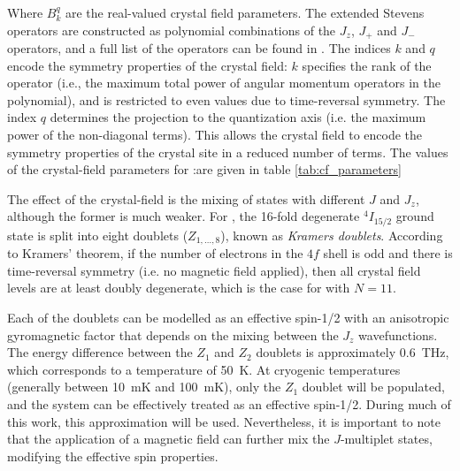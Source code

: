 Where $B_k^q$ are the real-valued crystal field parameters. The extended Stevens operators are constructed as polynomial combinations of the $J_z$, $J_+$ and $J_-$ operators, and a full list of the operators can be found in . The indices $k$ and $q$ encode the symmetry properties of the crystal field: $k$ specifies the rank of the operator (i.e., the maximum total power of angular momentum operators in the polynomial), and is restricted to even values due to time-reversal symmetry. The index $q$ determines the projection to the quantization axis (i.e. the maximum power of the non-diagonal terms). This allows the crystal field to encode the symmetry properties of the crystal site in a reduced number of terms. The values of the crystal-field parameters for \Er:\Ca are given in table \ref{tab:cf_parameters}

The effect of the crystal-field is the mixing of states with different $J$ and $J_z$, although the former is much weaker. For \Er, the 16-fold degenerate $^4I_{15/2}$ ground state is split into eight doublets ($Z_{1,\dots,8}$), known as \emph{Kramers doublets}. According to Kramers' theorem,  if the number of electrons in the $4f$ shell is odd and there is time-reversal symmetry (i.e. no magnetic field applied), then all crystal field levels are at least doubly degenerate, which is the case for \Er with $N=11$.

Each of the doublets can be modelled as an effective spin-1/2 with an anisotropic gyromagnetic factor that depends on the mixing between the $J_z$ wavefunctions. The energy difference between the $Z_1$ and $Z_2$ doublets is approximately 0.6~THz, which corresponds to a temperature of 50~K. At cryogenic temperatures (generally between 10~mK and 100~mK), only the $Z_1$ doublet will be populated, and the system can be effectively treated as an effective spin-1/2. During much of this work, this approximation will be used. Nevertheless, it is important to note that the application of a magnetic field can further mix the $J$-multiplet states, modifying the effective spin properties.


